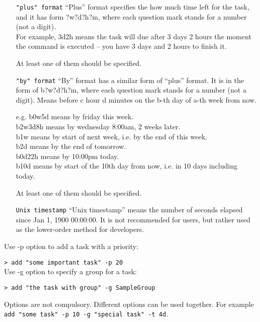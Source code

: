 \documentclass[12pt, a4paper]{article}
\begin{document}
\begin{enumerate}
\item[ \texttt{"plus" format} ]
  ``Plus'' format specifies the how much time left for the task, and it has form ?w?d?h?m, where each question mark stands for a number (not a digit).\\
  For example, 3d2h means the task will due after 3 days 2 hours the moment the command is executed -- you have 3 days and 2 hours to finish it.

  At least one of them should be specified.

\item[ \texttt{"by" format} ]
  ``By'' format has a similar form of ``plus'' format. It is in the form of b?w?d?h?m, where each question mark stands for a number (not a digit).
  Means before c hour d minutes on the b-th day of a-th week from now.

  e.g. b0w5d means by friday this week.\\
       b2w3d8h means by wednesday 8:00am, 2 weeks later.\\
       b1w means by start of next week, i.e. by the end of this week.\\
       b2d means by the end of tomorrow.\\
       b0d22h means by 10:00pm today.\\
       b10d means by start of the 10th day from now, i.e. in 10 days including today.

  At least one of them should be specified.
\item[ \texttt{Unix timestamp} ]
``Unix timestamp'' means the number of seconds elapsed since Jan 1, 1900 00:00:00. It is not recommended for users, but rather used as the lower-order method for developers.
\end{enumerate}

Use -p option to add a task with a priority:

\texttt{\textgreater \ add "some important task" -p 20}\\

Use -g option to specify a group for a task:

\texttt{\textgreater \ add "the task with group"\footnotemark \  -g SampleGroup}\\

Options are not compulsory. Different options can be used together. For example \texttt{add "some task" -p 10 -g "special task" -t 4d}.
\end{document}
